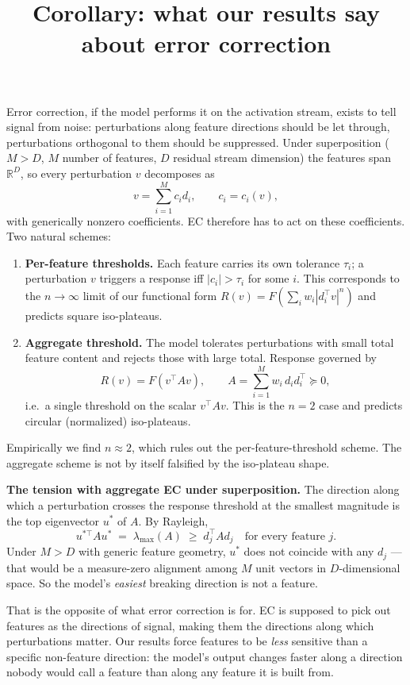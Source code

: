\documentclass[11pt]{article}
\title{Corollary: what our results say about error correction}
\date{}
\begin{document}
\maketitle

Error correction, if the model performs it on the activation stream, exists to tell signal from noise: perturbations along feature directions should be let through, perturbations orthogonal to them should be suppressed.
Under superposition ($M > D$, $M$ number of features, $D$ residual stream dimension) the features span $\mathbb{R}^D$, so every perturbation $v$ decomposes as
\[
v = \sum_{i=1}^M c_i d_i, \qquad c_i = c_i(v),
\]
with generically nonzero coefficients. EC therefore has to act on these coefficients. Two natural schemes:

\begin{enumerate}
\item \textbf{Per-feature thresholds.} Each feature carries its own tolerance $\tau_i$; a perturbation $v$ triggers a response iff $|c_i| > \tau_i$ for some $i$. This corresponds to the $n \to \infty$ limit of our functional form $R(v) = F\!\left(\sum_i w_i |d_i^\top v|^n\right)$ and predicts square iso-plateaus.

\item \textbf{Aggregate threshold.} The model tolerates perturbations with small total feature content and rejects those with large total. Response governed by
\[
R(v) = F(v^\top A v), \qquad A = \sum_{i=1}^M w_i\, d_i d_i^\top \succeq 0,
\]
i.e.\ a single threshold on the scalar $v^\top A v$. This is the $n = 2$ case and predicts circular (normalized) iso-plateaus.
\end{enumerate}

Empirically we find $n \approx 2$, which rules out the per-feature-threshold scheme. The aggregate scheme is not by itself falsified by the iso-plateau shape.

\medskip
\noindent\textbf{The tension with aggregate EC under superposition.} The direction along which a perturbation crosses the response threshold at the smallest magnitude is the top eigenvector $u^*$ of $A$. By Rayleigh,
\[
u^{*\top} A u^* \;=\; \lambda_{\max}(A) \;\geq\; d_j^\top A d_j \quad \text{for every feature } j.
\]
Under $M > D$ with generic feature geometry, $u^*$ does not coincide with any $d_j$ --- that would be a measure-zero alignment among $M$ unit vectors in $D$-dimensional space. So the model's \emph{easiest} breaking direction is not a feature.

That is the opposite of what error correction is for. EC is supposed to pick out features as the directions of signal, making them the directions along which perturbations matter. Our results force features to be \emph{less} sensitive than a specific non-feature direction: the model's output changes faster along a direction nobody would call a feature than along any feature it is built from.
\end{document}
